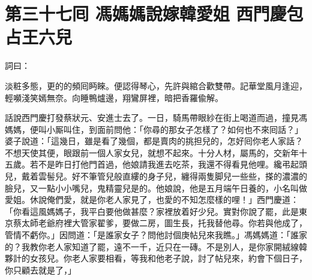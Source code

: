 
\chapter*{第三十七囘 馮媽媽說嫁韓愛姐 西門慶包占王六兒}


詞曰：

\begin{myquote}
淡粧多態，更的的頻囘眄睞。便認得琴心，先許與綰合歡雙帶。記華堂風月逢迎，輕嚬淺笑嫣無奈。向睡鴨爐邊，翔鸞屏裡，暗把香羅偸解。

\end{myquote}

話說西門慶打發蔡狀元、安進士去了。一日，騎馬帶眼紗在街上喝道而過，撞見馮媽媽，便叫小厮叫住，到面前問他：「你尋的那女子怎樣了？如何也不來囘話？」婆子說道：「這幾日，雖是看了幾個，都是賣肉的挑担兒的，怎好囘你老人家話？不想天使其便，眼跟前一個人家女兒，就想不起來。十分人材，屬馬的，交新年十五歲。若不是昨日打他門首過，他娘請我進去吃茶，我還不得看見他哩。纔弔起頭兒，戴着雲髻兒。好不筆管兒般直縷的身子兒，纏得兩隻脚兒一些些，搽的濃濃的臉兒，又一點小小嘴兒，鬼精靈兒是的。他娘說，他是五月端午日養的，小名叫做愛姐。休說俺們愛，就是你老人家見了，也愛的不知怎麼樣的哩！」西門慶道：「你看這風媽媽子，我平白要他做甚麼？家裡放着好少兒。實對你說了罷，此是東京蔡太師老爺府裡大管家翟爹，要做二房，圖生長，托我替他尋。你若與他成了，管情不虧你。」因問道：「是誰家女子？問他討個庚帖兒來我瞧。」馮媽媽道：「誰家的？我教你老人家知道了罷，遠不一千，近只在一磚。不是別人，是你家開絨線韓夥計的女孩兒。你老人家要相看，等我和他老子說，討了帖兒來，約會下個日子，你只顧去就是了，」

